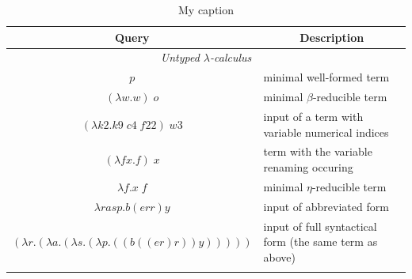 \documentclass[table, a4paper, 10pt]{book}
\begin{document}
\begin{table}[H]\scriptsize
\centering
\caption{My caption}
\label{my-label}
\begin{tabular}{cl}
\hline
\multicolumn{1}{|c|}{\large Query}                                                                                  & \multicolumn{1}{c|}{\large Description}                                      \\ \hline
\multicolumn{2}{|c|}{\scriptsize \textit{Untyped $\lambda$-calculus}}                                                                                                                              \\ \hline
\multicolumn{1}{|c|}{$p$}                                                                                           & \multicolumn{1}{l|}{minimal well-formed term}                                \\ \hline
\multicolumn{1}{|c|}{$(\lambda w.w)\;o$}                                                                            & \multicolumn{1}{l|}{minimal $\beta$-reducible term}                          \\ \hline
\multicolumn{1}{|c|}{$(\lambda k2.k9\;c4\;f22)\;w3$}                                                               & \multicolumn{1}{l|}{input of a term with variable numerical indices}         \\ \hline
\multicolumn{1}{|c|}{$(\lambda fx.f)\;x$}                                                                           & \multicolumn{1}{l|}{term with the variable renaming occuring}                \\ \hline
\multicolumn{1}{|c|}{$\lambda f.x\;f$}                                                                              & \multicolumn{1}{l|}{minimal $\eta$-reducible term}                           \\ \hline
\multicolumn{1}{|c|}{$\lambda rasp.b(err)y$}                                                                        & \multicolumn{1}{l|}{input of abbreviated form}                               \\ \hline
\multicolumn{1}{|c|}{$(\lambda r.(\lambda a.(\lambda s.(\lambda p.((b((er)r))y)))))$}                               & \multicolumn{1}{l|}{input of full syntactical form (the same term as above)} \\ \hline
\multicolumn{1}{|l|}{}                                                                                              & \multicolumn{1}{l|}{}                                                        \\ \hline

\end{tabular}
\end{table}
\end{document}
